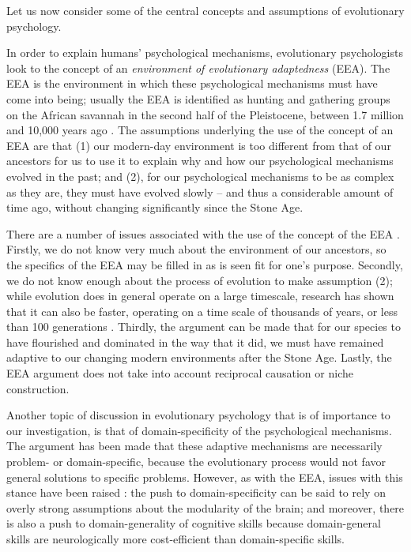 Let us now consider some of the central concepts and assumptions of evolutionary psychology.

In order to explain humans' psychological mechanisms, evolutionary psychologists look to the concept of an \emph{environment of evolutionary adaptedness} (EEA). The EEA is the environment in which these psychological mechanisms must have come into being; usually the EEA is identified as hunting and gathering groups on the African savannah in the second half of the Pleistocene, between 1.7 million and 10,000 years ago \citep{LB02}.
The assumptions underlying the use of the concept of an EEA are that (1) our modern-day environment is too different from that of our ancestors for us to use it to explain why and how our psychological mechanisms evolved in the past; and (2), for our psychological mechanisms to be as complex as they are, they must have evolved slowly -- and thus a considerable amount of time ago, without changing significantly since the Stone Age.

There are a number of issues associated with the use of the concept of the EEA \citep{LB02}. Firstly, we do not know very much about the environment of our ancestors, so the specifics of the EEA may be filled in as is seen fit for one's purpose. Secondly, we do not know enough about the process of evolution to make assumption (2); while evolution does in general operate on a large timescale, research has shown that it can also be faster, operating on a time scale of thousands of years, or less than 100 generations \citep[pp.~190--191 and references therein]{LB02}. Thirdly, the argument can be made that for our species to have flourished and dominated in the way that it did, we must have remained adaptive to our changing modern environments after the Stone Age. Lastly, the EEA argument does not take into account reciprocal causation or niche construction.

Another topic of discussion in evolutionary psychology that is of importance to our investigation, is that of domain-specificity of the psychological mechanisms. The argument has been made \citep[p.~50]{Buss15} that these adaptive mechanisms are necessarily problem- or domain-specific, because the evolutionary process would not favor general solutions to specific problems.
However, as with the EEA, issues with this stance have been raised \citep{LB02}: the push to domain-specificity can be said to rely on overly strong assumptions about the modularity of the brain; and moreover, there is also a push to domain-generality of cognitive skills because domain-general skills are neurologically more cost-efficient than domain-specific skills.

